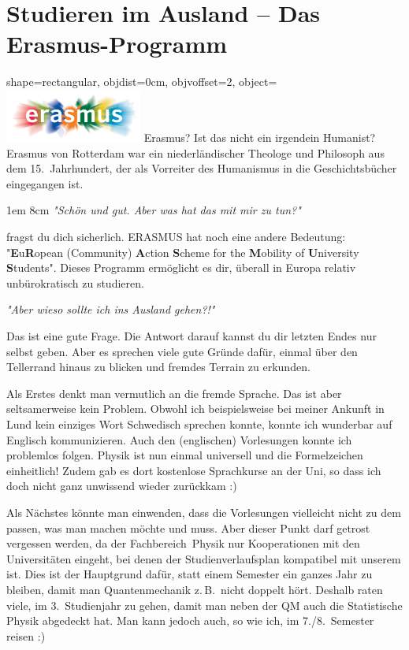 
\enlargethispage{2\baselineskip}
\section{Studieren im Ausland -- Das Erasmus-Programm}
\begin{pullquote}{shape=rectangular, objdist=0cm, objvoffset=2,
object={\includegraphics[width=4.5cm]{res/erasmus.jpg}}}
Erasmus? Ist das nicht ein irgendein Humanist? Erasmus von Rotterdam war ein niederländischer Theologe und Philosoph aus dem 15.~Jahrhundert, der als Vorreiter des Humanismus in die Geschichtsbücher eingegangen ist.

1em 8cm
\textit{"Schön und gut. Aber was hat das mit mir zu tun?"}

fragst du dich sicherlich. ERASMUS hat noch eine andere Bedeutung: "\textbf{E}u\textbf{R}opean (Community) \textbf{A}ction \textbf{S}cheme for the \textbf{M}obility of \textbf{U}niversity \textbf{S}tudents". Dieses Programm ermöglicht es dir, überall in Europa relativ unbürokratisch zu studieren.

\hspace{1em}\textit{"Aber wieso sollte ich ins Ausland gehen?!"}

Das ist eine gute Frage. Die Antwort darauf kannst du dir letzten Endes nur selbst geben. Aber es sprechen viele gute Gründe dafür, einmal über den Tellerrand hinaus zu blicken und fremdes Terrain zu erkunden.\pullquotenl

Als Erstes denkt man vermutlich an die fremde Sprache. Das ist aber seltsamerweise kein Problem. Obwohl ich beispielsweise bei meiner Ankunft in Lund kein einziges Wort Schwedisch sprechen konnte, konnte ich wunderbar auf Englisch kommunizieren. Auch den (englischen) Vorlesungen konnte ich problemlos folgen. Physik ist nun einmal universell und die Formelzeichen einheitlich! Zudem gab es dort kostenlose Sprachkurse an der Uni, so dass ich doch nicht ganz unwissend wieder zurückkam :)\pullquotenl

Als Nächstes könnte man einwenden, dass die Vorlesungen vielleicht nicht zu dem passen, was man machen möchte und muss. Aber dieser Punkt darf getrost vergessen werden, da der Fachbereich~Physik nur Kooperationen mit den Universitäten eingeht, bei denen der Studienverlaufsplan kompatibel mit unserem ist. Dies ist der Hauptgrund dafür, statt einem Semester ein ganzes Jahr zu bleiben, damit man Quantenmechanik z.\,B.\ nicht doppelt hört. Deshalb raten viele, im 3.~Studienjahr zu gehen, damit man neben der QM auch die Statistische Physik abgedeckt hat. Man kann jedoch auch, so wie ich, im 7./8.~Semester reisen :)\pullquotenl


\end{pullquote}
